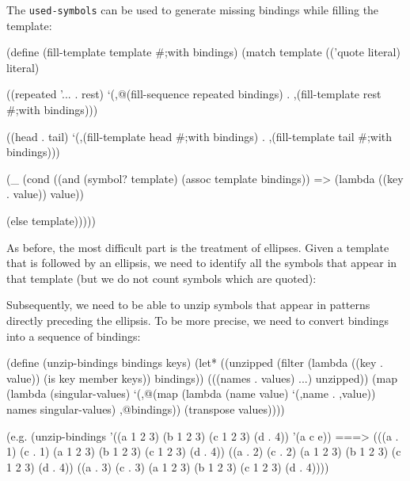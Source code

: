 The \texttt{used-symbols} can be used to generate missing
bindings while filling the template:

\begin{Snippet}
  (define (fill-template template #;with bindings)
    (match template
      (('quote literal)
       literal)
\end{Snippet}
\begin{Snippet}
    ((repeated '... . rest)
     `(,@(fill-sequence repeated bindings)
       . ,(fill-template rest #;with bindings)))
\end{Snippet}
\begin{Snippet}
    ((head . tail)
     `(,(fill-template head #;with bindings)
       . ,(fill-template tail #;with bindings)))
\end{Snippet}
\begin{Snippet}
    (_
     (cond ((and (symbol? template)
                 (assoc template bindings))
            => (lambda ((key . value))
                 value))
\end{Snippet}
\begin{Snippet}
           (else
            template)))))
\end{Snippet}

As before, the most difficult part is the treatment of ellipses. Given
a template that is followed by an ellipsis, we need to identify all
the symbols that appear in that template (but we do not count symbols
which are quoted):

Subsequently, we need to be able to unzip symbols that appear
in patterns directly preceding the ellipsis. To be more precise,
we need to convert bindings into a sequence of bindings:

\begin{Snippet}
(define (unzip-bindings bindings keys)
  (let* ((unzipped (filter (lambda ((key . value))
			     (is key member keys))
			   bindings))
	 (((names . values) ...) unzipped))
    (map (lambda (singular-values)
	   `(,@(map (lambda (name value)
		      `(,name . ,value))
		    names singular-values)
	     ,@bindings))
	 (transpose values))))
\end{Snippet}

\begin{Snippet}
  (e.g.
   (unzip-bindings '((a 1 2 3) (b 1 2 3) (c 1 2 3) (d . 4)) '(a c e))
    ===> (((a . 1) (c . 1) (a 1 2 3) (b 1 2 3) (c 1 2 3) (d . 4))
          ((a . 2) (c . 2) (a 1 2 3) (b 1 2 3) (c 1 2 3) (d . 4))
          ((a . 3) (c . 3) (a 1 2 3) (b 1 2 3) (c 1 2 3) (d . 4))))
\end{Snippet}

